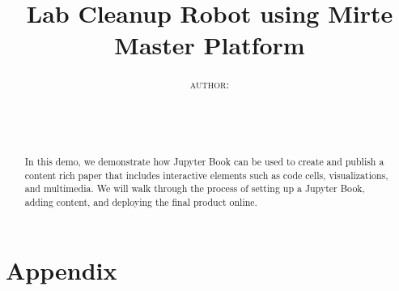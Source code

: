 \documentclass{article}
\title{Lab Cleanup Robot using Mirte Master Platform}
\date{%
  \ThesisExtraInfo\\[1.5em]
  \displaydate{articleDate}\\[1.5em]
}
\author{
\textsc{
author: %
}}
\newcommand{\showPageNumbers}{arabic} %
\begin{document}
\maketitle
\vfill


\vfill

\newpage

\begin{abstract}
In this demo, we demonstrate how Jupyter Book can be used to create and publish a content rich paper that includes
interactive elements such as code cells, visualizations, and multimedia. We will walk through the process of setting
up a Jupyter Book, adding content, and deploying the final product online.
\end{abstract}
\vspace{1.5em}
\clearpage

\setcounter{tocdepth}{2}

  \setcounter{tocdepth}{2}

\clearpage
\tableofcontents
\clearpage

\pagenumbering{\showPageNumbers}














\section{Appendix}








\printglossaries


\clearpage

\end{document}
